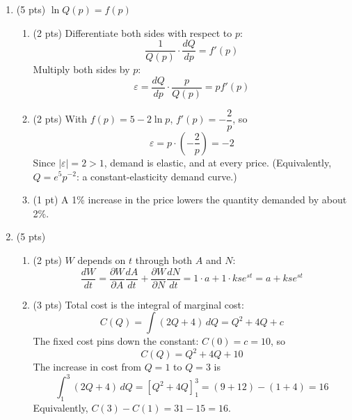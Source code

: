 \documentclass{./../../latex/tests}
\begin{document}
\begin{enumerate}
\item (5 pts) $\ln Q(p) = f(p)$
\begin{enumerate}
\item (2 pts) Differentiate both sides with respect to $p$:
\[ \frac{1}{Q(p)} \cdot \frac{dQ}{dp} = f'(p) \]
Multiply both sides by $p$:
\[ \varepsilon = \frac{dQ}{dp} \cdot \frac{p}{Q(p)} = p f'(p) \]
\item (2 pts) With $f(p) = 5 - 2 \ln p$, $f'(p) = -\dfrac{2}{p}$, so
\[ \varepsilon = p \cdot \left( -\frac{2}{p} \right) = -2 \]
Since $|\varepsilon| = 2 > 1$, demand is elastic, and at every price. (Equivalently, $Q = e^{5} p^{-2}$: a constant-elasticity demand curve.)
\item (1 pt) A 1\% increase in the price lowers the quantity demanded by about 2\%.
\end{enumerate}

\item (5 pts)
\begin{enumerate}
\item (2 pts) $W$ depends on $t$ through both $A$ and $N$:
\[ \frac{dW}{dt} = \frac{\partial W}{\partial A} \frac{dA}{dt} + \frac{\partial W}{\partial N} \frac{dN}{dt} = 1 \cdot a + 1 \cdot ks e^{st} = a + ks e^{st} \]
\item (3 pts) Total cost is the integral of marginal cost:
\[ C(Q) = \int (2Q + 4)\, dQ = Q^2 + 4Q + c \]
The fixed cost pins down the constant: $C(0) = c = 10$, so
\[ C(Q) = Q^2 + 4Q + 10 \]
The increase in cost from $Q = 1$ to $Q = 3$ is
\[ \int_1^3 (2Q + 4)\, dQ = \left[ Q^2 + 4Q \right]_1^3 = (9 + 12) - (1 + 4) = 16 \]
Equivalently, $C(3) - C(1) = 31 - 15 = 16$.
\end{enumerate}

\end{enumerate}
\end{document}
